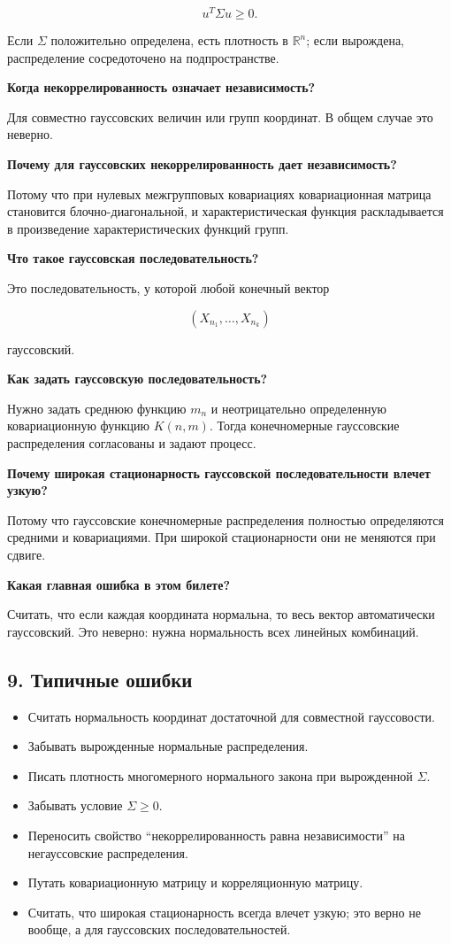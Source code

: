 \documentclass[
  11pt,
  a4paper,
]{article}
\providecommand{\tightlist}{%
  \setlength{\itemsep}{0pt}\setlength{\parskip}{0pt}}
\begin{document}
\[
u^T\Sigma u\ge0.
\]

Если \(\Sigma\) положительно определена, есть плотность в
\(\mathbb R^n\); если вырождена, распределение сосредоточено на
подпространстве.

\textbf{Когда некоррелированность означает независимость?}

Для совместно гауссовских величин или групп координат. В общем случае
это неверно.

\textbf{Почему для гауссовских некоррелированность дает независимость?}

Потому что при нулевых межгрупповых ковариациях ковариационная матрица
становится блочно-диагональной, и характеристическая функция
раскладывается в произведение характеристических функций групп.

\textbf{Что такое гауссовская последовательность?}

Это последовательность, у которой любой конечный вектор

\[
(X_{n_1},\ldots,X_{n_k})
\]

гауссовский.

\textbf{Как задать гауссовскую последовательность?}

Нужно задать среднюю функцию \(m_n\) и неотрицательно определенную
ковариационную функцию \(K(n,m)\). Тогда конечномерные гауссовские
распределения согласованы и задают процесс.

\textbf{Почему широкая стационарность гауссовской последовательности
влечет узкую?}

Потому что гауссовские конечномерные распределения полностью
определяются средними и ковариациями. При широкой стационарности они не
меняются при сдвиге.

\textbf{Какая главная ошибка в этом билете?}

Считать, что если каждая координата нормальна, то весь вектор
автоматически гауссовский. Это неверно: нужна нормальность всех линейных
комбинаций.

\subsection{9. Типичные
ошибки}\label{ux442ux438ux43fux438ux447ux43dux44bux435-ux43eux448ux438ux431ux43aux438}

\begin{itemize}
\tightlist
\item
  Считать нормальность координат достаточной для совместной гауссовости.
\item
  Забывать вырожденные нормальные распределения.
\item
  Писать плотность многомерного нормального закона при вырожденной
  \(\Sigma\).
\item
  Забывать условие \(\Sigma\ge0\).
\item
  Переносить свойство ``некоррелированность равна независимости'' на
  негауссовские распределения.
\item
  Путать ковариационную матрицу и корреляционную матрицу.
\item
  Считать, что широкая стационарность всегда влечет узкую; это верно не
  вообще, а для гауссовских последовательностей.
\end{itemize}
\end{document}
